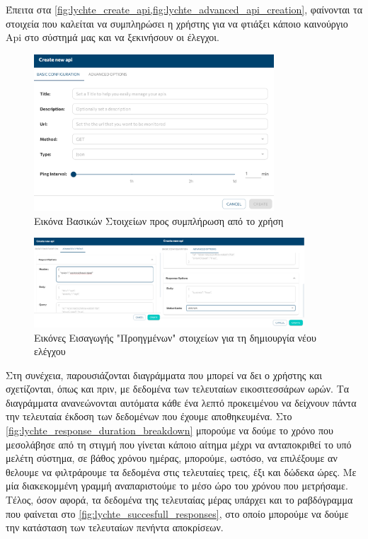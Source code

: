 \clearpage

Έπειτα στα \cref{fig:lychte_create_api,fig:lychte_advanced_api_creation}, φαίνονται
τα στοιχεία που καλείται να συμπληρώσει η χρήστης για να φτιάξει κάποιο καινούργιο Api στο σύστημά μας και να ξεκινήσουν
οι έλεγχοι. \\

\begin{figure}[!ht]
	\centering
	\includegraphics[width=0.8\textwidth]{./images/chapter5/api_creation.png}
	\caption[Εικόνα Βασικών Στοιχείων προς συμπλήρωση από το χρήση]{Εικόνα Βασικών Στοιχείων προς συμπλήρωση από το χρήση}
	\label{fig:lychte_create_api}
\end{figure}

\begin{figure}[!ht]
	\centering
	\includegraphics[width=0.9\textwidth]{./images/chapter5/api_creation_advanced.png}
	\caption[Εικόνες Εισαγωγής "Προηγμένων" στοιχείων για τη δημιουργία νέου ελέγχου]{Εικόνες Εισαγωγής "Προηγμένων" στοιχείων για τη δημιουργία νέου ελέγχου}
	\label{fig:lychte_advanced_api_creation}
\end{figure}

\clearpage

Στη συνέχεια, παρουσιάζονται διαγράμματα που μπορεί να δει ο χρήστης και σχετίζονται, όπως και πριν, με δεδομένα
των τελευταίων εικοσιτεσσάρων ωρών. Τα διαγράμματα ανανεώνονται αυτόματα κάθε ένα λεπτό προκειμένου να δείχνουν
πάντα την τελευταία έκδοση των δεδομένων που έχουμε αποθηκευμένα. Στο \autoref{fig:lychte_response_duration_breakdown}
μπορούμε να δούμε το χρόνο που μεσολάβησε από τη στιγμή που γίνεται κάποιο αίτημα μέχρι να ανταποκριθεί το υπό μελέτη
σύστημα, σε βάθος χρόνου ημέρας, μπορούμε, ωστόσο, να επιλέξουμε αν θελουμε να φιλτράρουμε τα δεδομένα στις τελευταίες τρεις, έξι και δώδεκα ώρες.
Με μία διακεκομμένη γραμμή αναπαριστούμε το μέσο ώρο του χρόνου που μετρήσαμε. Τέλος, όσον αφορά, τα δεδομένα της τελευταίας μέρας
υπάρχει και το ραβδόγραμμα που φαίνεται στο \autoref{fig:lychte_succesfull_responses}, στο οποίο μπορούμε να δούμε την κατάσταση των τελευταίων
πενήντα αποκρίσεων.\\

